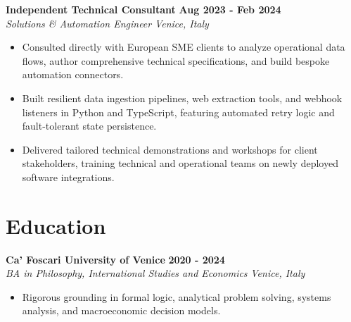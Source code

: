 \documentclass[10pt,a4paper]{article}
\newcommand{\role}[4]{%
  \textbf{#1} \hfill \textbf{#2}\\[1pt]%
  \textit{#3} \hfill \textit{#4}\\[2pt]%
}
\begin{document}
\role{Independent Technical Consultant}{Aug 2023 - Feb 2024}{Solutions \& Automation Engineer}{Venice, Italy}
\begin{itemize}
  \item Consulted directly with European SME clients to analyze operational data flows, author comprehensive technical specifications, and build bespoke automation connectors.
  \item Built resilient data ingestion pipelines, web extraction tools, and webhook listeners in Python and TypeScript, featuring automated retry logic and fault-tolerant state persistence.
  \item Delivered tailored technical demonstrations and workshops for client stakeholders, training technical and operational teams on newly deployed software integrations.
\end{itemize}

\section{Education}
\role{Ca' Foscari University of Venice}{2020 - 2024}{BA in Philosophy, International Studies and Economics}{Venice, Italy}
\begin{itemize}
  \item Rigorous grounding in formal logic, analytical problem solving, systems analysis, and macroeconomic decision models.
\end{itemize}
\end{document}
